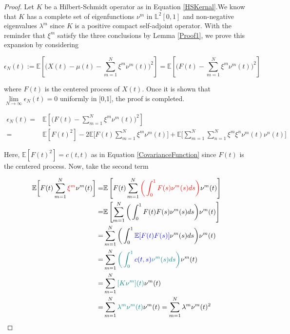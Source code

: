 \documentclass[11pt,twoside,a4paper]{article}
\begin{document}
	\begin{proof}
		
		Let $K$ be a Hilbert-Schmidt operator as in Equation \ref{HSKernal}.We know that $K$ has a complete set of eigenfunctions ${\nu^m}$ in $\mathbb{L}^{2}[0,1]$  and non-negative eigenvalues $\lambda^m$ since $K$ is a positive compact self-adjoint operator. With the reminder that $\xi^m$ satisfy the three conclusions by Lemma \ref{Proof1}, we prove this expansion by considering
		
		\begin{equation}
			\epsilon_{N}(t) := \mathbb{E} \left[\bigg( X(t) -\mu(t)- \sum_{m=1}^{N} \xi^m \nu^m(t)\bigg)^2 \right]
			= \mathbb{E} \left[\bigg( F(t) - \sum_{m=1}^{N} \xi^m \nu^m(t)\bigg)^2 \right]
		\end{equation}
	
		where $F(t)$ is the centered process of $X(t)$.
		Once it is shown that $\lim\limits_{N \rightarrow \infty} \epsilon_{N}(t) = 0$ uniformly in [0,1], the proof is completed.
		
		\begin{equation}\label{Thr1}
			\begin{split}
				\epsilon_{N}(t) = &\mathbb{E} \left[\bigg( F(t) - \sum_{m=1}^{N} \xi^m 	\nu^m(t)\bigg)^2 \right]\\
				= & \mathbb{E}[F(t)^{2}] - 2\mathbb{E}\bigg[F(t)\sum_{m=1}^{N}\xi^m\nu^m(t)\bigg] + \mathbb{E}\bigg[\sum_{m=1}^{N}\sum_{n=1}^{N}\xi^m\xi^n\nu^m(t)\nu^n(t)\bigg]
			\end{split}
		\end{equation}
		
		Here, $\mathbb{E}[F(t)^{2}] = c(t,t)$ as in Equation \ref{CovarianceFunction} since $F(t)$ is the centered process. Now, take the second term
		
		\begin{equation}\label{Thr2}
			\begin{split}
				\mathbb{E} \bigg[ F(t) \sum_{m=1}^{N} {\color{red}\xi^m}\nu^m(t) \bigg] = & \mathbb{E} \left[ F(t) \sum_{m=1}^{N} {\color{red}\bigg(\int_{0}^{1} F(s)\nu^m(s)ds\bigg)} \nu^m(t) \right]\\
				= & \mathbb{E} \left[ \sum_{m=1}^{N} \bigg(\int_{0}^{1} F(t)F(s)\nu^m(s)ds\bigg) \nu^m(t) \right]\\
				= & \sum_{m=1}^{N} \bigg(\int_{0}^{1} {\color{blue}\mathbb{E}[F(t)F(s)]}\nu^m(s)ds\bigg)\nu^m(t)\\
				= & \sum_{m=1}^{N} {\color{teal}\bigg(\int_{0}^{1} {\color{blue}c(t,s)} \nu^m(s)ds\bigg)}\nu^m(t)\\
				= & \sum_{m=1}^{N}{\color{teal}[K\nu^m](t)}\nu^m(t) \\
				= &\sum_{m=1}^{N}{\color{teal}\lambda^m\nu^m(t)}\nu^m(t) = \sum_{m=1}^{N}\lambda^m\nu^m(t)^{2}
			\end{split}
		\end{equation} 
		

\end{proof}
\end{document}
